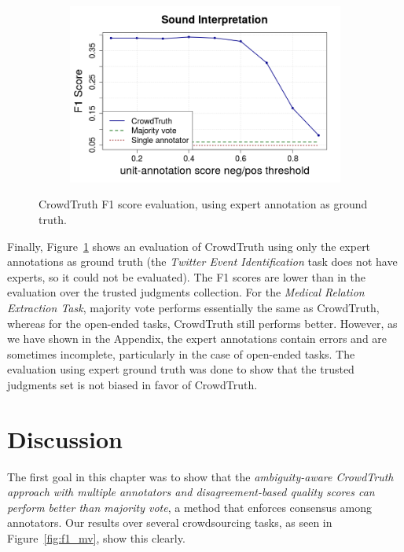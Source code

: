 \begin{figure}[!tbh]
\begin{subfigure}{.5\textwidth}
\end{subfigure}%
\begin{subfigure}{.5\textwidth}
\includegraphics[width=\linewidth]{img/exp_eval_sounds.png}
\end{subfigure}
\caption{CrowdTruth F1 score evaluation, using expert annotation as ground truth.}
\label{fig:f1_exp}
\end{figure}

Finally, Figure~\ref{fig:f1_exp} shows an evaluation of CrowdTruth using only the expert annotations as ground truth (the \textit{Twitter Event Identification} task does not have experts, so it could not be evaluated). The F1 scores are lower than in the evaluation over the trusted judgments collection. For the \textit{Medical Relation Extraction Task}, majority vote performs essentially the same as CrowdTruth, whereas for the open-ended tasks, CrowdTruth still performs better. However, as we have shown in the Appendix, the expert annotations contain errors and are sometimes incomplete, particularly in the case of open-ended tasks. The evaluation using expert ground truth was done to show that the trusted judgments set is not biased in favor of CrowdTruth.


\section{Discussion}
\label{sec:discussion}

The first goal in this chapter was to show that the \textit{ambiguity-aware CrowdTruth approach with multiple annotators and disagreement-based quality scores can perform better than majority vote}, a method that enforces consensus among annotators.  Our results over several crowdsourcing tasks, as seen in Figure~\ref{fig:f1_mv}, show this clearly.


